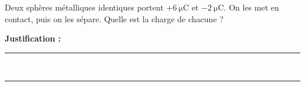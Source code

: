 Deux sphères métalliques identiques portent $+\qty{6}{\micro\coulomb}$ et $-\qty{2}{\micro\coulomb}$. On les met en contact, puis on les sépare. Quelle est la charge de chacune ?

\choices

\noindent\textbf{Justification :} \hrulefill \\[2.5ex]
\rule{\linewidth}{0.4pt} \\[2.5ex]
\rule{\linewidth}{0.4pt}
\vfill
